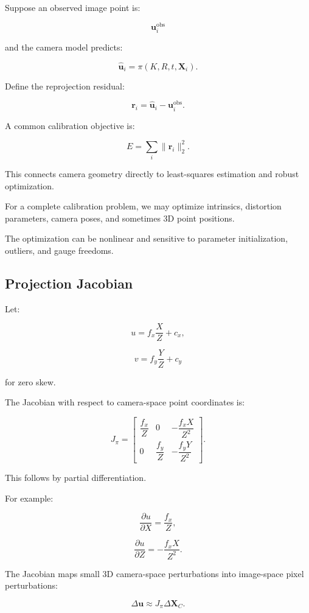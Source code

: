 Suppose an observed image point is:

\[
 \mathbf u_i^{\mathrm{obs}}
\]

and the camera model predicts:

\[
 \hat{\mathbf u}_i= \pi(K,R,t,\mathbf X_i).
\]

Define the reprojection residual:

\[
 \boxed{ \mathbf r_i= \hat{\mathbf u}_i-\mathbf u_i^{\mathrm{obs}} }.
\]

A common calibration objective is:

\[
 \boxed{ E= \sum_i \|\mathbf r_i\|_2^2 }.
\]

This connects camera geometry directly to least-squares estimation and robust optimization.

For a complete calibration problem, we may optimize intrinsics, distortion parameters, camera poses, and sometimes 3D point positions.

The optimization can be nonlinear and sensitive to parameter initialization, outliers, and gauge freedoms.

\subsection{Projection Jacobian}\label{02-foundations-ii-ch035-projection-jacobian}

Let:

\[
 u=f_x\frac XZ+c_x,
\]

\[
 v=f_y\frac YZ+c_y
\]

for zero skew.

The Jacobian with respect to camera-space point coordinates is:

\[
 \boxed{ J_\pi= \begin{bmatrix} \dfrac{f_x}{Z}&0&-\dfrac{f_xX}{Z^2}\\ 0&\dfrac{f_y}{Z}&-\dfrac{f_yY}{Z^2} \end{bmatrix} }.
\]

This follows by partial differentiation.

For example:

\[
 \frac{\partial u}{\partial X}=\frac{f_x}{Z},
\]

\[
 \frac{\partial u}{\partial Z}=-\frac{f_xX}{Z^2}.
\]

The Jacobian maps small 3D camera-space perturbations into image-space pixel perturbations:

\[
 \boxed{ \Delta\mathbf u\approx J_\pi\Delta\mathbf X_C }.
\]

